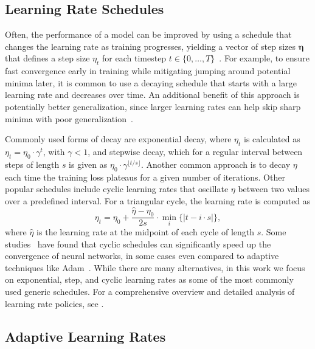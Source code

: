 \documentclass{article} %
\begin{document}
\subsection{Learning Rate Schedules}

Often, the performance of a model can be improved by using a schedule that changes the learning rate as training progresses, yielding a vector of step sizes $\bm{\eta}$ that defines a step size $\eta_t$ for each timestep $t \in \{0, \ldots, T\}$~\citep{wuDemystifyingLearningRate2019b}.
For example, to ensure fast convergence early in training while mitigating jumping around potential minima later, it is common to use a decaying schedule that starts with a large learning rate and decreases over time.
An additional benefit of this approach is potentially better generalization, since larger learning rates can help skip sharp minima with poor generalization~\citep{hochreiterFlatMinima1997,chaudhariEntropySGDBiasingGradient2017}.

Commonly used forms of decay are exponential decay, where $\eta_{t}$ is calculated as
$\eta_{t} = \eta_0 \cdot \gamma^t$,
with $\gamma < 1$, and stepwise decay, which for a regular interval between steps of length $s$ is given as $\eta_0 \cdot \gamma^{\lfloor t/s \rfloor}$.
Another common approach is to decay $\eta$ each time the training loss plateaus for a given number of iterations. Other popular schedules include cyclic learning rates that oscillate $\eta$ between two values over a predefined interval.
For a triangular cycle, the learning rate is computed as
\begin{equation}
   \eta_t = \eta_0 + \frac{\hat{\eta} - \eta_0}{2s} \cdot \min_{i} \{|t-i\cdot s|\},
\end{equation}
where $\hat{\eta}$ is the learning rate at the midpoint of each cycle of length $s$.
Some studies~\citep{smithCyclicalLearningRates2017, smithSuperConvergenceVeryFast2018a} have found that cyclic schedules can significantly speed up the convergence of neural networks, in some cases even compared to adaptive techniques like Adam~\citep{kingmaAdamMethodStochastic2017b}.
While there are many alternatives, in this work we focus on exponential, step, and cyclic learning rates as some of the most commonly used generic schedules.
For a comprehensive overview and detailed analysis of learning rate policies, see \citet{wuDemystifyingLearningRate2019b}.

\subsection{Adaptive Learning Rates}
\end{document}
